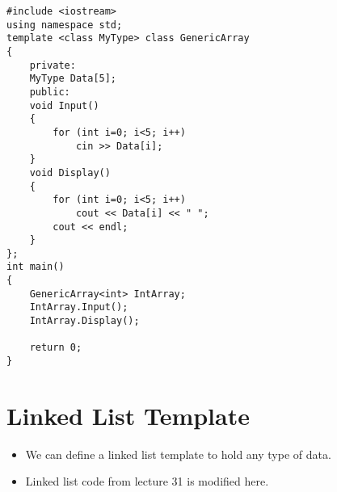 \documentclass[12pt,a4paper]{article}
\begin{document}
\begin{lstlisting}[caption={Class template}]
#include <iostream>
using namespace std;
template <class MyType> class GenericArray
{
	private:
	MyType Data[5];
	public:
	void Input()
	{
		for (int i=0; i<5; i++)
			cin >> Data[i];
	}
	void Display()
	{
		for (int i=0; i<5; i++)
			cout << Data[i] << " ";
		cout << endl;
	}
};
int main()
{
	GenericArray<int> IntArray;
	IntArray.Input();
	IntArray.Display();
	
	return 0;
}
\end{lstlisting}
\section{Linked List Template}
\begin{itemize}
\item We can define a linked list template to hold any type of data.
\item Linked list code from lecture 31 is modified here.
\end{itemize}
\end{document}
